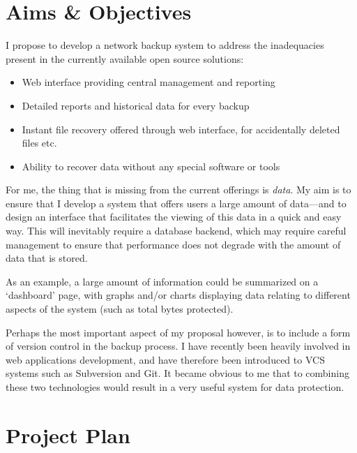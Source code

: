 \documentclass[a4paper]{article}
\begin{document}
    \section{Aims \& Objectives}
    I propose to develop a network backup system to address the inadequacies
    present in the currently available open source solutions:

    \begin{itemize}
        \item Web interface providing central management and reporting
        \item Detailed reports and historical data for every backup
        \item Instant file recovery offered through web interface, for
            accidentally deleted files etc.
        \item Ability to recover data without any special software or tools
    \end{itemize}

    For me, the thing that is missing from the current offerings is
    \emph{data}. My aim is to ensure that I develop a system that offers users
    a large amount of data---and to design an interface that facilitates the
    viewing of this data in a quick and easy way. This will inevitably require
    a database backend, which may require careful management to ensure that
    performance does not degrade with the amount of data that is stored.

    As an example, a large amount of information could be summarized on
    a `dashboard' page, with graphs and/or charts displaying data relating to
    different aspects of the system (such as total bytes protected).

    Perhaps the most important aspect of my proposal however, is to include
    a form of version control in the backup process. I have recently been
    heavily involved in web applications development, and have therefore been
    introduced to VCS systems such as Subversion and Git. It became obvious to
    me that to combining these two technologies would result in a very useful
    system for data protection.

    \section{Project Plan}
\end{document}
